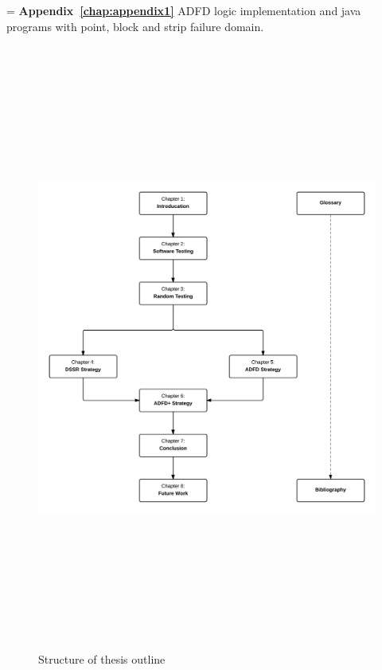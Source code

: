  \hangindent=\parindent
 \noindent
 \textbf{Appendix~\ref{chap:appendix1}} ADFD logic implementation and java programs with point, block and strip failure domain.\\

\newpage
\begin{figure}[h]
	\centering
		\includegraphics[width=16cm, height=20cm ]{chapter1/thesisOutline.png}
		\caption{Structure of thesis outline}
	\label{fig:thesisOutline}
\end{figure}





